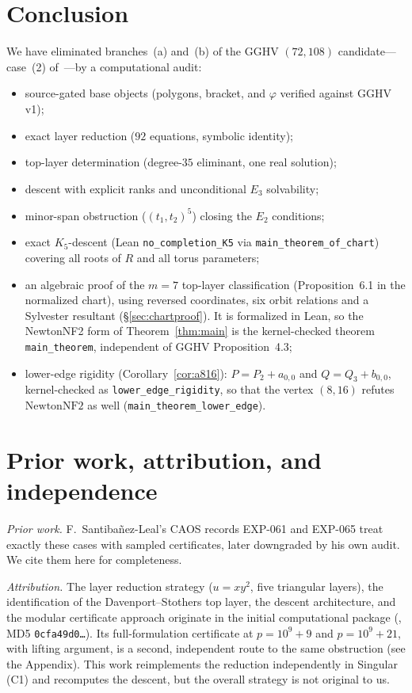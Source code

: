 \documentclass[a4paper,11pt]{article}
\newcommand{\filename}[1]{\texttt{\seqsplit{#1}}}
\theoremstyle{plain}
\theoremstyle{definition}
\theoremstyle{remark}
\begin{document}
\section{Conclusion}\label{sec:conclusion}

We have eliminated branches~(a) and~(b) of the GGHV $(72,108)$ candidate---case~(2) of~\cite[Proposition~4.3]{GGHV}---by a computational audit:
\begin{itemize}[nosep]
\item source-gated base objects (polygons, bracket, and $\varphi$ verified against GGHV v1);
\item exact layer reduction ($92$ equations, symbolic identity);
\item top-layer determination (degree-$35$ eliminant, one real solution);
\item descent with explicit ranks and unconditional $E_3$ solvability;
\item minor-span obstruction ($(t_1,t_2)^5$) closing the $E_2$ conditions;
\item exact $K_5$-descent (Lean \texttt{no\_completion\_K5} via \texttt{main\_theorem\_of\_chart}) covering all roots of $R$ and all torus parameters;
\item an algebraic proof of the $m=7$ top-layer classification (Proposition~6.1 in the normalized chart), using reversed coordinates, six orbit relations and a Sylvester resultant (\S\ref{sec:chartproof}). It is formalized in Lean, so the NewtonNF2 form of Theorem~\ref{thm:main} is the kernel-checked theorem \texttt{main\_theorem}, independent of GGHV Proposition~4.3;
\item lower-edge rigidity (Corollary~\ref{cor:a816}): $P=P_2+a_{0,0}$ and $Q=Q_3+b_{0,0}$, kernel-checked as \texttt{lower\_edge\_rigidity}, so that the vertex $(8,16)$ refutes $\mathrm{NewtonNF2}$ as well (\texttt{main\_theorem\_lower\_edge}).
\end{itemize}

\section{Prior work, attribution, and independence}\label{sec:attribution}

\emph{Prior work.} F.~Santiba\~nez-Leal's CAOS records EXP-061 and EXP-065 treat exactly these cases with sampled certificates, later downgraded by his own audit. We cite them here for completeness.

\emph{Attribution.} The layer reduction strategy ($u=xy^2$, five triangular layers), the identification of the Davenport--Stothers top layer, the descent architecture, and the modular certificate approach originate in the initial computational package (\filename{branch\_ab\_elimination.zip}, MD5 \texttt{0cfa49d0\dots}). Its full-formulation certificate at $p=10^9+9$ and $p=10^9+21$, with lifting argument, is a second, independent route to the same obstruction (see the Appendix). This work reimplements the reduction independently in {\sc Singular} (C1) and recomputes the descent, but the overall strategy is not original to us.
\end{document}
